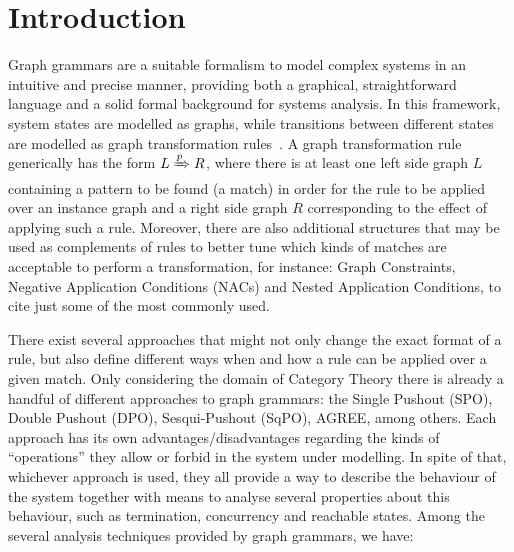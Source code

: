 \chapter{Introduction}

Graph grammars are a suitable formalism to model complex systems in an intuitive and precise manner, providing both a graphical, straightforward language and a solid formal background for systems analysis. In this framework, system states are modelled as graphs, while transitions between different states are modelled as graph transformation rules~\cite{Ehrig2006}. A graph transformation rule generically has the form $L \xRightarrow{p} R$, where there is at least one left side graph $L$ containing a pattern to be found (a match) in order for the rule to be applied over an instance graph and a right side graph $R$ corresponding to the effect of applying such a rule. Moreover, there are also additional structures that may be used as complements of rules to better tune which kinds of matches are acceptable to perform a transformation, for instance: Graph Constraints, Negative Application Conditions (NACs) and Nested Application Conditions, to cite just some of the most commonly used.

There exist several approaches that might not only change the exact format of a rule, but also define different ways when and how a rule can be applied over a given match. Only considering the domain of Category Theory there is already a handful of different approaches to graph grammars: the Single Pushout (SPO), Double Pushout (DPO), Sesqui-Pushout (SqPO), AGREE, among others. Each approach has its own advantages/disadvantages regarding the kinds of  ``operations'' they allow or forbid in the system under modelling. 
In spite of that, whichever approach is used, they all provide a way to describe the behaviour of the system together with means to analyse several properties about this behaviour, such as termination, concurrency and reachable states. Among the several analysis techniques provided by graph grammars, we have:

